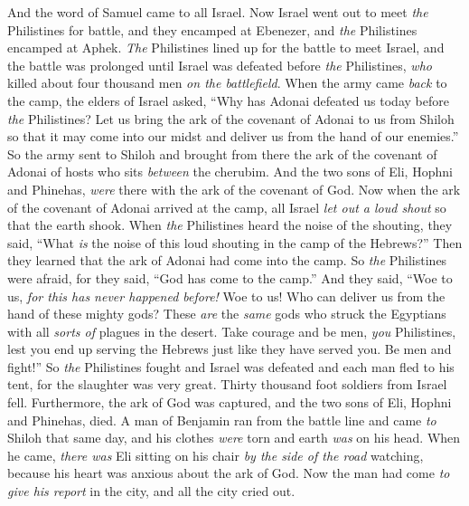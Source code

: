 \begin{biblechapter} %
 And the word of Samuel came to all Israel. Now Israel went out to meet \textit{the} Philistines for battle, and they encamped at Ebenezer, and \textit{the} Philistines encamped at Aphek.
\verse \textit{The} Philistines lined up for the battle to meet Israel, and the battle was prolonged until Israel was defeated before \textit{the} Philistines, \textit{who} killed about four thousand men \textit{on the battlefield}.
\verse When the army came \textit{back} to the camp, the elders of Israel asked, “Why has Adonai defeated us today before \textit{the} Philistines? Let us bring the ark of the covenant of Adonai to us from Shiloh so that it may come into our midst and deliver us from the hand of our enemies.”
\verse So the army sent to Shiloh and brought from there the ark of the covenant of Adonai of hosts who sits \textit{between} the cherubim. And the two sons of Eli, Hophni and Phinehas, \textit{were} there with the ark of the covenant of God.
\verse Now when the ark of the covenant of Adonai arrived at the camp, all Israel \textit{let out a loud shout} so that the earth shook.
\verse When \textit{the} Philistines heard the noise of the shouting, they said, “What \textit{is} the noise of this loud shouting in the camp of the Hebrews?” Then they learned that the ark of Adonai had come into the camp.
\verse So \textit{the} Philistines were afraid, for they said, “God has come to the camp.” And they said, “Woe to us, \textit{for this has never happened before!}
\verse Woe to us! Who can deliver us from the hand of these mighty gods? These \textit{are} the \textit{same} gods who struck the Egyptians with all \textit{sorts of} plagues in the desert.
\verse Take courage and be men, \textit{you} Philistines, lest you end up serving the Hebrews just like they have served you. Be men and fight!”
\verse So \textit{the} Philistines fought and Israel was defeated and each man fled to his tent, for the slaughter was very great. Thirty thousand foot soldiers from Israel fell.
\verse Furthermore, the ark of God was captured, and the two sons of Eli, Hophni and Phinehas, died.
\verse A man of Benjamin ran from the battle line and came \textit{to} Shiloh that same day, and his clothes \textit{were} torn and earth \textit{was} on his head.
\verse When he came, \textit{there was} Eli sitting on his chair \textit{by the side of the road} watching, because his heart was anxious about the ark of God. Now the man had come \textit{to give his report} in the city, and all the city cried out.

\end{biblechapter}

